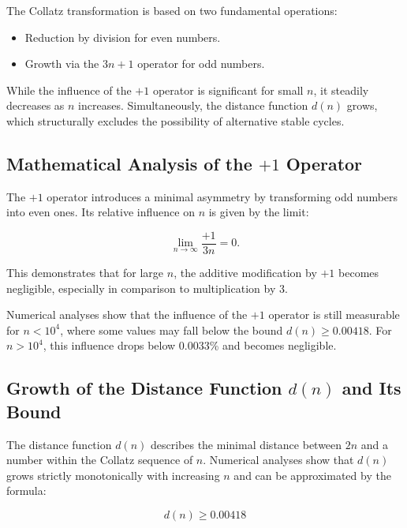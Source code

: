 \documentclass[a4paper,12pt]{article}
\begin{document}
The Collatz transformation is based on two fundamental operations:

\begin{itemize}
    \item Reduction by division for even numbers.
    \item Growth via the \( 3n+1 \) operator for odd numbers.
\end{itemize}

While the influence of the \( +1 \) operator is significant for small \( n \), it steadily decreases as \( n \) increases. Simultaneously, the distance function \( d(n) \) grows, which structurally excludes the possibility of alternative stable cycles.

\subsection{Mathematical Analysis of the \( +1 \) Operator}

The \( +1 \) operator introduces a minimal asymmetry by transforming odd numbers into even ones. Its relative influence on \( n \) is given by the limit:

\begin{equation} 
    \lim_{n \to \infty} \frac{+1}{3n} = 0.
\end{equation}

This demonstrates that for large \( n \), the additive modification by \( +1 \) becomes negligible, especially in comparison to multiplication by 3.

Numerical analyses show that the influence of the \( +1 \) operator is still measurable for \( n < 10^4 \), where some values may fall below the bound \( d(n) \geq 0.00418  \). For \( n > 10^4 \), this influence drops below 0.0033\% and becomes negligible.

\subsection{Growth of the Distance Function \( d(n) \) and Its Bound}

The distance function \( d(n) \) describes the minimal distance between \( 2n \) and a number within the Collatz sequence of \( n \). Numerical analyses show that \( d(n) \) grows strictly monotonically with increasing \( n \) and can be approximated by the formula:

\begin{equation} 
    d(n) \geq 0.00418
\end{equation}
\end{document}

